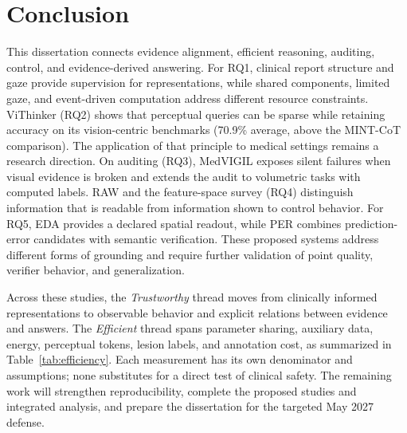 \section{Conclusion}\label{sec:conclusion}
This dissertation connects evidence alignment, efficient reasoning, auditing, control, and evidence-derived answering. For RQ1, clinical report structure and gaze provide supervision for representations, while shared components, limited gaze, and event-driven computation address different resource constraints. ViThinker (RQ2) shows that perceptual queries can be sparse while retaining accuracy on its vision-centric benchmarks (70.9\% average, above the MINT-CoT comparison). The application of that principle to medical settings remains a research direction. On auditing (RQ3), MedVIGIL exposes silent failures when visual evidence is broken and extends the audit to volumetric tasks with computed labels. RAW and the feature-space survey (RQ4) distinguish information that is readable from information shown to control behavior. For RQ5, EDA provides a declared spatial readout, while PER combines prediction-error candidates with semantic verification. These proposed systems address different forms of grounding and require further validation of point quality, verifier behavior, and generalization.

Across these studies, the \emph{Trustworthy} thread moves from clinically informed representations to observable behavior and explicit relations between evidence and answers. The \emph{Efficient} thread spans parameter sharing, auxiliary data, energy, perceptual tokens, lesion labels, and annotation cost, as summarized in Table~\ref{tab:efficiency}. Each measurement has its own denominator and assumptions; none substitutes for a direct test of clinical safety. The remaining work will strengthen reproducibility, complete the proposed studies and integrated analysis, and prepare the dissertation for the targeted May 2027 defense.
